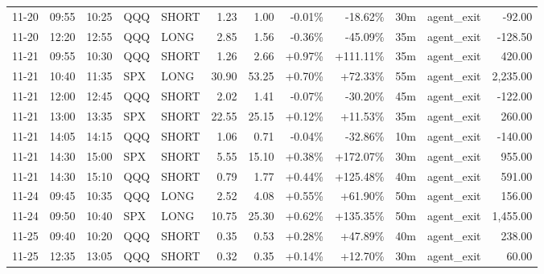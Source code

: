 \documentclass[11pt,a4paper,twoside]{article}
\begin{document}
\begin{center}
\begin{longtable}{>{\color{txtmain}}l l l l l r r r r r >{\color{txtmain}}l r}
11-20 & 09:55 & 10:25 & QQQ & SHORT & 1.23 & 1.00 & \textcolor{lossred}{-0.01\%} & \textcolor{lossred}{-18.62\%} & 30m & agent\_exit & \textcolor{lossred}{-92.00} \\
11-20 & 12:20 & 12:55 & QQQ & LONG & 2.85 & 1.56 & \textcolor{lossred}{-0.36\%} & \textcolor{lossred}{-45.09\%} & 35m & agent\_exit & \textcolor{lossred}{-128.50} \\
11-21 & 09:55 & 10:30 & QQQ & SHORT & 1.26 & 2.66 & \textcolor{wingreen}{+0.97\%} & \textcolor{wingreen}{+111.11\%} & 35m & agent\_exit & \textcolor{wingreen}{420.00} \\
11-21 & 10:40 & 11:35 & SPX & LONG & 30.90 & 53.25 & \textcolor{wingreen}{+0.70\%} & \textcolor{wingreen}{+72.33\%} & 55m & agent\_exit & \textcolor{wingreen}{2,235.00} \\
11-21 & 12:00 & 12:45 & QQQ & SHORT & 2.02 & 1.41 & \textcolor{lossred}{-0.07\%} & \textcolor{lossred}{-30.20\%} & 45m & agent\_exit & \textcolor{lossred}{-122.00} \\
11-21 & 13:00 & 13:35 & SPX & SHORT & 22.55 & 25.15 & \textcolor{wingreen}{+0.12\%} & \textcolor{wingreen}{+11.53\%} & 35m & agent\_exit & \textcolor{wingreen}{260.00} \\
11-21 & 14:05 & 14:15 & QQQ & SHORT & 1.06 & 0.71 & \textcolor{lossred}{-0.04\%} & \textcolor{lossred}{-32.86\%} & 10m & agent\_exit & \textcolor{lossred}{-140.00} \\
11-21 & 14:30 & 15:00 & SPX & SHORT & 5.55 & 15.10 & \textcolor{wingreen}{+0.38\%} & \textcolor{wingreen}{+172.07\%} & 30m & agent\_exit & \textcolor{wingreen}{955.00} \\
11-21 & 14:30 & 15:10 & QQQ & SHORT & 0.79 & 1.77 & \textcolor{wingreen}{+0.44\%} & \textcolor{wingreen}{+125.48\%} & 40m & agent\_exit & \textcolor{wingreen}{591.00} \\
11-24 & 09:45 & 10:35 & QQQ & LONG & 2.52 & 4.08 & \textcolor{wingreen}{+0.55\%} & \textcolor{wingreen}{+61.90\%} & 50m & agent\_exit & \textcolor{wingreen}{156.00} \\
11-24 & 09:50 & 10:40 & SPX & LONG & 10.75 & 25.30 & \textcolor{wingreen}{+0.62\%} & \textcolor{wingreen}{+135.35\%} & 50m & agent\_exit & \textcolor{wingreen}{1,455.00} \\
11-25 & 09:40 & 10:20 & QQQ & SHORT & 0.35 & 0.53 & \textcolor{wingreen}{+0.28\%} & \textcolor{wingreen}{+47.89\%} & 40m & agent\_exit & \textcolor{wingreen}{238.00} \\
11-25 & 12:35 & 13:05 & QQQ & SHORT & 0.32 & 0.35 & \textcolor{wingreen}{+0.14\%} & \textcolor{wingreen}{+12.70\%} & 30m & agent\_exit & \textcolor{wingreen}{60.00} \\

\end{longtable}
\end{center}
\end{document}
